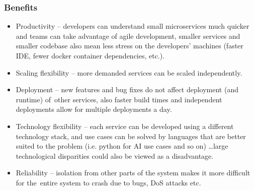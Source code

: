 \subsubsection{Benefits}
\begin{itemize}
    \item Productivity -- developers can understand small microservices much quicker and teams can take advantage of agile development, smaller services and smaller codebase also mean less stress on the developers' machines (faster IDE, fewer docker container dependencies, etc.).
    
    \item Scaling flexibility -- more demanded services can be scaled independently.
   
    \item Deployment -- new features and bug fixes do not affect deployment (and runtime) of~other services, also faster build times and independent deployments allow for multiple deployments a day.
    
    \item Technology flexibility -- each service can be developed using  a different technology stack, and use cases can be solved by languages that are better suited to the problem (i.e. python for AI use cases and so on) \dots large technological disparities could also be viewed as a disadvantage.
    
    \item Reliability -- isolation from other parts of the system makes it more difficult for the~entire system to crash due to bugs, DoS attacks etc.
\end{itemize}

